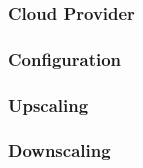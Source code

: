 \subsubsection{Cloud Provider}
\label{subsubsec:implementation_autoscaling_cluster_autoscaler_cloud_provider}

\subsubsection{Configuration}
\label{subsubsec:implementation_autoscaling_cluster_autoscaler_configuration}


\subsubsection{Upscaling}
\label{subsubsec:implementation_autoscaling_cluster_autoscaler_upscaling}

\subsubsection{Downscaling}
\label{subsubsec:implementation_autoscaling_cluster_autoscaler_downscaling}
